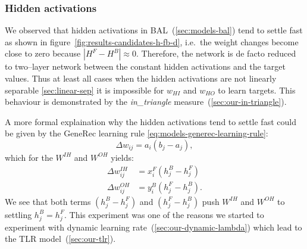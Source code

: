 
\subsubsection{Hidden activations}
\label{sec:our-hidden-activation} 

We observed that hidden activations in BAL~(\ref{sec:models-bal}) tend to settle fast as shown in figure~\ref{fig:results-candidates-h-fb-d}, i.e.~the weight changes become close to zero because $|H^F - H^B| \approx 0$. Therefore, the network is de facto reduced to two--layer network between the constant hidden activations and the target values. Thus at least all cases when the hidden activations are not linearly separable \ref{sec:linear-sep} it is impossible for $w_{HI}$ and $w_{HO}$ to learn targets. This behaviour is demonstrated by the \emph{in\_triangle} measure~(\ref{sec:our-in-triangle}). 

A more formal explaination why the hidden activations tend to settle fast could be given by the GeneRec learning rule \ref{eq:models-generec-learning-rule}: 
\begin{equation} 
  \Delta w_{ij} = a_i(b_j - a_j),
\end{equation} \nonumber 
which for the $W^{IH}$ and $W^{OH}$ yields: 
\begin{align} 
  \Delta w_{ij}^{IH} &= x^F_i(h^B_j - h^F_j) \nonumber \\ 
  \Delta w_{ij}^{OH} &= y^B_i(h^F_j - h^B_j). \nonumber  
\end{align} 
We see that both terms $(h^B_j - h^F_j)$ and $(h^F_j - h^B_j)$ push $W^{IH}$ and $W^{OH}$ to settling $h^B_j = h^F_j$. This experiment was one of the reasons we started to experiment with dynamic learning rate~(\ref{sec:our-dynamic-lambda}) which lead to the TLR model~(\ref{sec:our-tlr}). 

